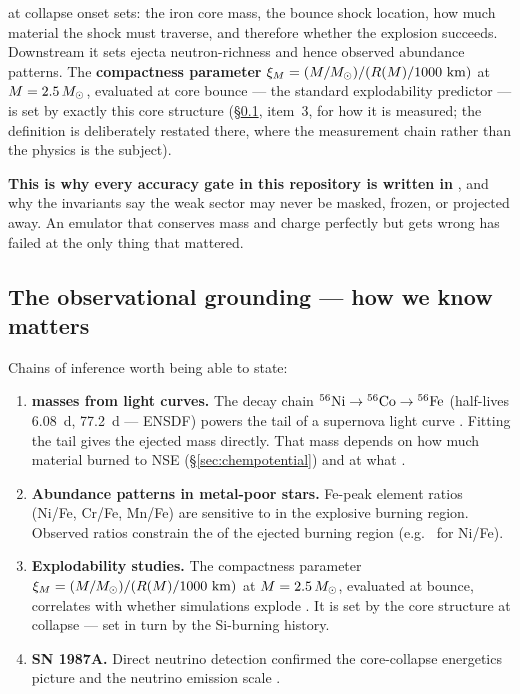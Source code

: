 \Ye{} at collapse onset sets: the iron core mass, the bounce shock location,
how much material the shock must traverse, and therefore whether the explosion
succeeds. Downstream it sets ejecta neutron-richness and hence observed
abundance patterns. The \textbf{compactness parameter}
$\xi_M = (M/\Msun)/(R(M)/1000~\mathrm{km})$ at $M = 2.5\,\Msun$, evaluated at
core bounce \citep{oconnor2011} --- the standard explodability predictor ---
is set by exactly this core structure (\S\ref{sec:obsgrounding}, item~3, for
how it is measured; the definition is deliberately restated there, where the
measurement chain rather than the physics is the subject).

\textbf{This is why every accuracy gate in this repository is written in
\Ye{}}, and why the invariants say the weak sector may never be masked, frozen,
or projected away. An emulator that conserves mass and charge perfectly but
gets \Ye{} wrong has failed at the only thing that mattered.

\subsection{The observational grounding --- how we know \texorpdfstring{\Ye{}}{Ye} matters}
\label{sec:obsgrounding}

Chains of inference worth being able to state:

\begin{enumerate}
\item \textbf{ masses from light curves.} The decay chain
      $\nuc{Ni}{56} \to \nuc{Co}{56} \to \nuc{Fe}{56}$ (half-lives 6.08~d,
      77.2~d --- ENSDF) powers the tail of a supernova light curve
      \citep{arnett1982,diehl2015}. Fitting the tail gives the ejected
       mass directly. That mass depends on how much material burned
      to NSE (\S\ref{sec:chempotential}) and at what \Ye{}.

\item \textbf{Abundance patterns in metal-poor stars.} Fe-peak element ratios
      (Ni/Fe, Cr/Fe, Mn/Fe) are sensitive to \Ye{} in the explosive burning
      region. Observed ratios constrain the \Ye{} of the ejected burning region
      (e.g.\ \citealt{jerkstrand2015} for Ni/Fe).

\item \textbf{Explodability studies.} The compactness parameter
      $\xi_M = (M/\Msun)/(R(M)/1000~\mathrm{km})$ at $M = 2.5\,\Msun$,
      evaluated at bounce, correlates with whether simulations explode
      \citep{oconnor2011}. It is set by the core structure at collapse --- set
      in turn by the Si-burning history.

\item \textbf{SN 1987A.} Direct neutrino detection confirmed the core-collapse
      energetics picture and the neutrino emission scale
      \citep{hirata1987,bionta1987}.
\end{enumerate}

